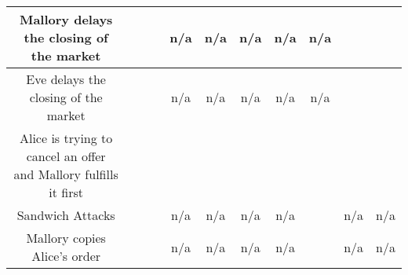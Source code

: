 \begin{table*}[t]
\begin{tabular}{|c|c|c|c|c|c|c|c|c|c|c|}
Mallory delays the closing of the market      										&					&\checkmark 		&														&n/a			&n/a			&n/a			&n/a			&n/a			&\full			&\full					\\ 	\hline
Eve delays the closing of the market   											&					&					&\checkmark  											&n/a			&n/a			&n/a			&n/a			&n/a			&\full			&\full						\\ 	\hline
\shortstack{Alice is trying to cancel an offer \\ and Mallory fulfills it first}							&					&					& \checkmark  											&\empt			&\empt			&\empt			&\empt			&\empt			&\full			&\full			\\ 	\hline
Sandwich Attacks															&\checkmark 		&					&   														&n/a		&n/a			&n/a		&n/a			&\empt			&n/a			&n/a		\\ 	\hline
Mallory copies Alice's order													&		 			&					& \checkmark   													&n/a		&n/a			&n/a		&n/a			&\empt			&n/a			&n/a		\\ 	\hline




\end{tabular}
\end{table*}
